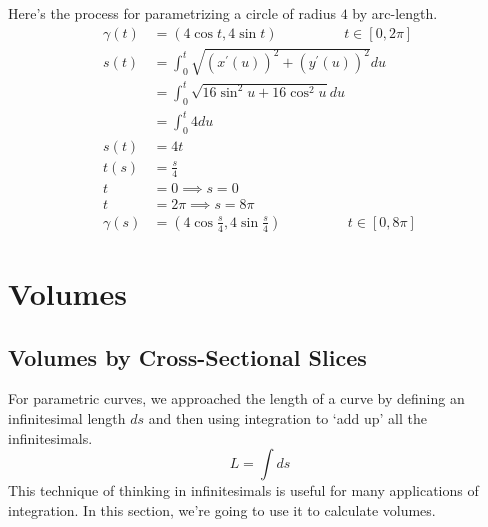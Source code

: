\documentclass[fleqn]{report}
\begin{document}
\begin{example}
Here's the process for parametrizing a circle of radius $4$ by
arc-length.
\begin{align*}
\gamma(t) & = (4 \cos t, 4 \sin t) \hspace{2cm} t \in [0, 2\pi] \\
s(t) & = \int_0^t \sqrt{(x^\prime(u))^2 + (y^\prime(u))^2} du \\
& = \int_0^t \sqrt{16 \sin^2 u + 16 \cos^2 u} du \\
& = \int_0^t 4 du \\
s(t) & = 4t \\
t(s) & = \frac{s}{4} \\
t & = 0 \implies s = 0 \\
t & = 2\pi \implies s = 8\pi \\
\gamma(s) & = \left(4 \cos \frac{s}{4}, 4 \sin \frac{s}{4}
\right) \hspace{2cm} t \in [0,8\pi]
\end{align*}
\end{example}

\section{Volumes}
\label{volumes}

\subsection{Volumes by Cross-Sectional Slices}
\label{cross-sectional-slices}

For parametric curves, we approached the length of a curve by
defining an infinitesimal length $ds$ and then using
integration to `add up' all the infinitesimals.
\begin{equation*}
L = \int ds
\end{equation*}
This technique of thinking in infinitesimals is useful for
many applications of integration. In this section, we're going to
use it to calculate volumes.
\end{document}

